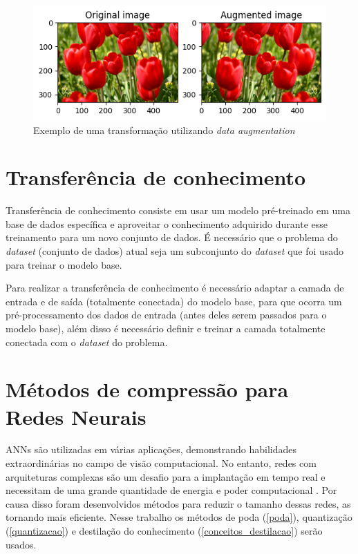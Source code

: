 \begin{figure}[htb]
	\caption {\label{cap_conceitos_exemplo_da}Exemplo de uma transformação utilizando \textit{data augmentation}}
	\begin{center}
		\includegraphics[scale=1]{Imagens/exemplo_da}
	\end{center}
\end{figure}

\section{Transferência de conhecimento}\label{cap_conceitos_transferencia}
Transferência de conhecimento consiste em usar um modelo pré-treinado em uma base de dados específica e aproveitar
o conhecimento adquirido durante esse treinamento para um novo conjunto de dados.
É necessário que o problema do \textit{dataset} (conjunto de dados) atual seja um subconjunto do \textit{dataset}
que foi usado para treinar o modelo base.

Para realizar a transferência de conhecimento é necessário adaptar a camada de entrada e de saída
(totalmente conectada) do modelo base, para que ocorra um pré-processamento dos dados de entrada
(antes deles serem passados para o modelo base), além disso é necessário definir e treinar a camada totalmente
conectada com o \textit{dataset} do problema.

\section{Métodos de compressão para Redes Neurais}\label{cap_conceitos_compressao_redes}
ANNs são utilizadas em várias aplicações, demonstrando habilidades extraordinárias no campo de visão computacional.
No entanto, redes com arquiteturas complexas são um desafio para a implantação em tempo real e necessitam de uma
grande quantidade de energia e poder computacional \cite{LIANG2021370}.
Por causa disso foram desenvolvidos métodos para reduzir o tamanho dessas redes, as tornando mais eficiente.
Nesse trabalho os métodos de poda (\ref{poda}), quantização (\ref{quantizacao}) e destilação do conhecimento
(\ref{conceitos_destilacao}) serão usados.

